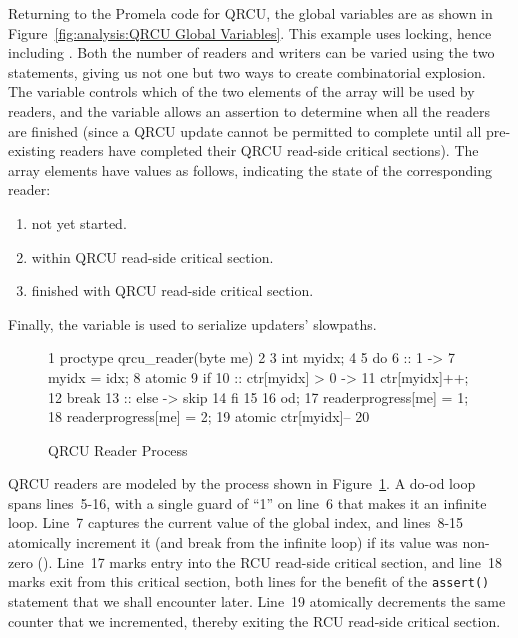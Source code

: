 Returning to the Promela code for QRCU, the global variables are as shown in
Figure~\ref{fig:analysis:QRCU Global Variables}.
This example uses locking, hence including .
Both the number of readers and writers can be varied using the
two  statements, giving us not one but two ways to create
combinatorial explosion.
The  variable controls which of the two elements of the 
array will be used by readers, and the  variable
allows an assertion to determine when all the readers are finished
(since a QRCU update cannot be permitted to complete until all
pre-existing readers have completed their QRCU read-side critical
sections).
The  array elements have values as follows,
indicating the state of the corresponding reader:

\begin{enumerate}[label={\arabic*}:,start=0,itemsep=0pt]
\item	not yet started.
\item	within QRCU read-side critical section.
\item	finished with QRCU read-side critical section.
\end{enumerate}

Finally, the  variable is used to serialize updaters' slowpaths.

\begin{figure}[htbp]
{ \scriptsize
\begin{verbbox}
  1 proctype qrcu_reader(byte me)
  2 {
  3   int myidx;
  4
  5   do
  6   :: 1 ->
  7     myidx = idx;
  8     atomic {
  9       if
 10       :: ctr[myidx] > 0 ->
 11         ctr[myidx]++;
 12         break
 13       :: else -> skip
 14       fi
 15     }
 16   od;
 17   readerprogress[me] = 1;
 18   readerprogress[me] = 2;
 19   atomic { ctr[myidx]-- }
 20 }
\end{verbbox}
}
\centering
\theverbbox
\caption{QRCU Reader Process}
\label{fig:analysis:QRCU Reader Process}
\end{figure}

QRCU readers are modeled by the  process shown in
Figure~\ref{fig:analysis:QRCU Reader Process}.
A do-od loop spans lines~5-16, with a single guard of ``1''
on line~6 that makes it an infinite loop.
Line~7 captures the current value of the global index, and lines~8-15
atomically increment it (and break from the infinite loop)
if its value was non-zero ().
Line~17 marks entry into the RCU read-side critical section, and
line~18 marks exit from this critical section, both lines for the benefit of
the {\tt assert()} statement that we shall encounter later.
Line~19 atomically decrements the same counter that we incremented,
thereby exiting the RCU read-side critical section.


